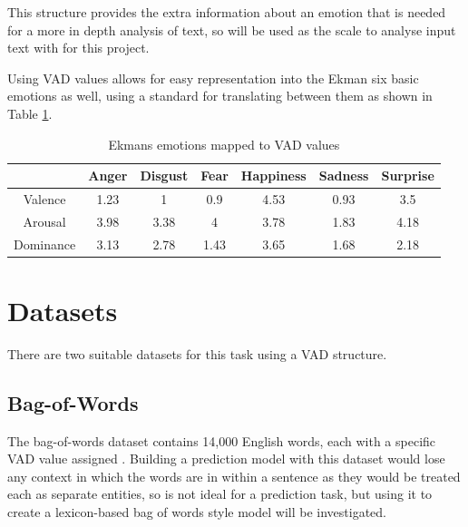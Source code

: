 This structure provides the extra information about an emotion that is needed for a more in depth analysis of text, so will be used as the scale to analyse input text with for this project.

Using VAD values allows for easy representation into the Ekman six basic emotions as well, using a standard for translating between them as shown in Table \ref{ekmansTable}.


\begin{table}[ht]
\caption{Ekmans emotions mapped to VAD values \cite{VADMapping}}
\centering
\begin{tabular}{ |c|c|c|c|c|c|c| } 
 \hline
  & Anger & Disgust & Fear & Happiness & Sadness & Surprise \\ 
 \hline                        
 Valence & 1.23 & 1 & 0.9 & 4.53 & 0.93 & 3.5\\ 
 Arousal & 3.98 & 3.38 & 4 & 3.78 & 1.83 & 4.18\\ 
 Dominance & 3.13 & 2.78 & 1.43 & 3.65 & 1.68 & 2.18\\ 
 \hline
\end{tabular}
\label{ekmansTable}
\end{table}

\section{Datasets}

There are two suitable datasets for this task using a VAD structure.

\subsection{Bag-of-Words}

The bag-of-words dataset contains 14,000 English words, each with a specific VAD value assigned \cite{wordsData}. Building a prediction model with this dataset would lose any context in which the words are in within a sentence as they would be treated each as separate entities, so is not ideal for a prediction task, but using it to create a lexicon-based bag of words style model will be investigated.

